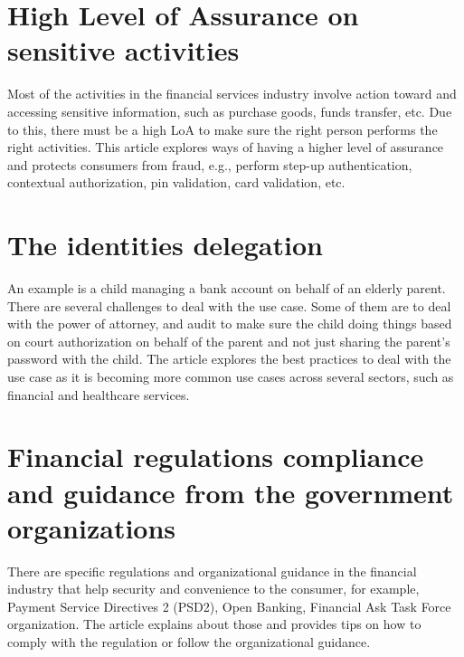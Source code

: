\hypertarget{high-level-of-assurance-on-sensitive-activities}{%
\section{High Level of Assurance on sensitive
activities}\label{high-level-of-assurance-on-sensitive-activities}}

Most of the activities in the financial services industry involve action
toward and accessing sensitive information, such as purchase goods,
funds transfer, etc. Due to this, there must be a high LoA to make sure
the right person performs the right activities. This article explores
ways of having a higher level of assurance and protects consumers from
fraud, e.g., perform step-up authentication, contextual authorization,
pin validation, card validation, etc.

\hypertarget{the-identities-delegation}{%
\section{The identities delegation}\label{the-identities-delegation}}

An example is a child managing a bank account on behalf of an elderly
parent. There are several challenges to deal with the use case. Some of
them are to deal with the power of attorney, and audit to make sure the
child doing things based on court authorization on behalf of the parent
and not just sharing the parent's password with the child. The article
explores the best practices to deal with the use case as it is becoming
more common use cases across several sectors, such as financial and
healthcare services.

\hypertarget{financial-regulations-compliance-and-guidance-from-the-government-organizations}{%
\section{Financial regulations compliance and guidance from the
government
organizations}\label{financial-regulations-compliance-and-guidance-from-the-government-organizations}}

There are specific regulations and organizational guidance in the
financial industry that help security and convenience to the consumer,
for example, Payment Service Directives 2 (PSD2), Open Banking,
Financial Ask Task Force organization. The article explains about those
and provides tips on how to comply with the regulation or follow the
organizational guidance.

